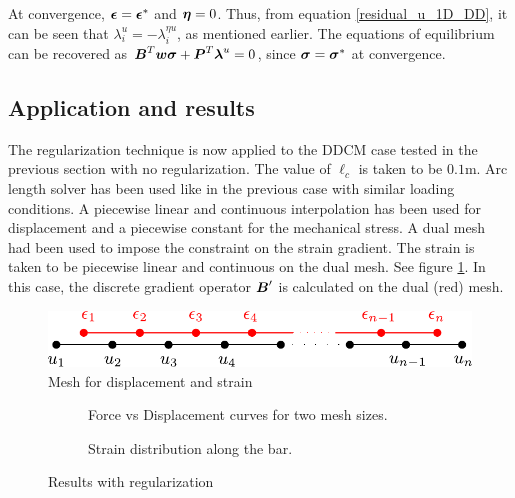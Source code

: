 \documentclass[12pt]{elsarticle}
\begin{document}
At convergence, $\mbox{\boldmath $\epsilon$}=\mbox{\boldmath $\epsilon$}^*$ and $\mbox{\boldmath $\eta$}=0$. Thus, from equation \ref{residual_u_1D_DD}, it can be seen that $\lambda^u_i = -\lambda^{\eta u}_i$, as mentioned earlier. The equations of equilibrium can be recovered as $\mbox{\boldmath $B$}^T \mbox{\boldmath $w$} \mbox{\boldmath $\sigma$} +\mbox{\boldmath $P$}^T \mbox{\boldmath $\lambda$}^{u} =0$, since $\mbox{\boldmath $\sigma$} = \mbox{\boldmath $\sigma$}^*$ at convergence.

\subsection{Application and results}
The regularization technique is now applied to the DDCM case tested in the previous section with no regularization. The value of $\ell_c$ is taken to be $0.1\si{\meter}$. Arc length solver has been used like in the previous case with similar loading conditions. A piecewise linear and continuous interpolation has been used for displacement and a piecewise constant for the mechanical stress. A dual mesh had been used to impose the constraint on the strain gradient. The strain is taken to be piecewise linear and continuous on the dual mesh. See figure \ref{mesh_dual_1d}. In this case, the discrete gradient operator $\mbox{\boldmath $B$}'$ is calculated on the dual (red) mesh.

\begin{figure}[ht]
	\centering
	\includegraphics[width=0.5\linewidth]{./mesh_dual_1d.pdf}
	\caption{Mesh for displacement and strain}
	\label{mesh_dual_1d}
\end{figure}



\begin{figure}[ht]
	\begin{subfigure}{0.45\textwidth}
		\centering
		
		\caption{Force vs Displacement curves for two mesh sizes.}
		\label{force_disp_nonlocal}
	\end{subfigure}
	\hfill
	\begin{subfigure}{0.45\textwidth}
		\centering
		
		\caption{Strain distribution along the bar.}
		\label{strain_dist_nonlocal}
	\end{subfigure}
	\caption{Results with regularization}
	\label{fig:Results_with_regularization}
\end{figure}
\end{document}
